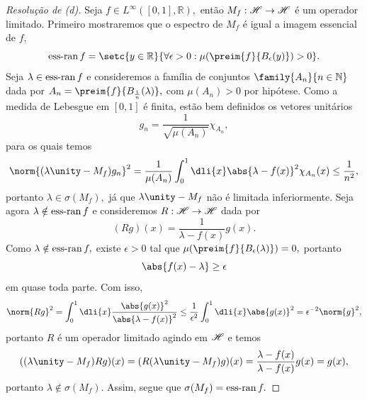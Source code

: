 \begin{proof}[Resolução de (d)]
  Seja \(f \in L^\infty([0,1],\mathbb{R}),\) então \(M_f : \mathscr{H} \to \mathscr{H}\) é um operador limitado. Primeiro mostraremos que o espectro de \(M_f\) é igual a imagem essencial de \(f,\)
  \begin{equation*}
    \essran{f} = \setc{y \in \mathbb{R}}{\forall \epsilon > 0 : \mu(\preim{f}{B_\epsilon(y)}) > 0}.
  \end{equation*}
  Seja \(\lambda \in \operatorname{ess-ran}{f}\) e consideremos a família de conjuntos \(\family{A_n}{n \in \mathbb{N}}\) dada por \(A_n = \preim{f}{B_{\frac1n}(\lambda)},\) com \(\mu(A_n) > 0\) por hipótese. Como a medida de Lebesgue em \([0,1]\) é finita, estão bem definidos os vetores unitários
  \begin{equation*}
    g_n = \frac{1}{\sqrt{\mu(A_n)}} \chi_{A_n},
  \end{equation*}
  para os quais temos
  \begin{equation*}
    \norm{(\lambda \unity - M_f)g_n}^2 = \frac{1}{\mu(A_n)}\int_0^1\dli{x} \abs{\lambda - f(x)}^2 \chi_{A_n}(x) \leq \frac1{n^2},
  \end{equation*}
  portanto \(\lambda \in \sigma(M_f),\) já que \(\lambda \unity - M_f\) não é limitada inferiormente. Seja agora \(\lambda \notin \operatorname{ess-ran}{f}\) e consideremos \(R : \mathscr{H} \to \mathscr{H}\) dada por
  \begin{equation*}
    (Rg)(x) = \frac{1}{\lambda - f(x)}g(x).
  \end{equation*}
  Como \(\lambda \notin \operatorname{ess-ran}{f},\) existe \(\epsilon > 0\) tal que \(\mu(\preim{f}{B_\epsilon(\lambda)}) = 0,\) portanto
  \begin{equation*}
    \abs{f(x) - \lambda} \geq \epsilon
  \end{equation*}
  em quase toda parte. Com isso,
  \begin{equation*}
    \norm{Rg}^2 = \int_0^1 \dli{x} \frac{\abs{g(x)}^2}{\abs{\lambda - f(x)}^2} \leq \frac{1}{\epsilon^2} \int_0^1\dli{x} \abs{g(x)}^2 = \epsilon^{-2} \norm{g}^2,
  \end{equation*}
  portanto \(R\) é um operador limitado agindo em \(\mathscr{H}\) e temos
  \begin{equation*}
    ((\lambda \unity - M_f)Rg)(x) = (R(\lambda \unity - M_f)g)(x) = \frac{\lambda - f(x)}{\lambda - f(x)}g(x) = g(x),
  \end{equation*}
  portanto \(\lambda \notin \sigma(M_f).\) Assim, segue que \(\sigma(M_f) = \operatorname{ess-ran}{f}.\)


\end{proof}
